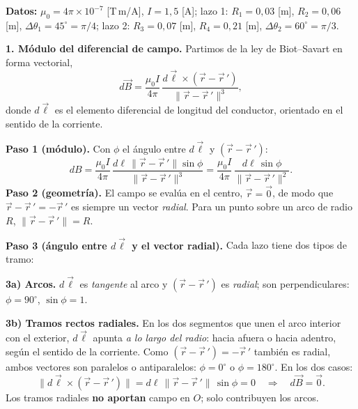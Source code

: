 \documentclass[12pt,letterpaper]{article}
\newcommand{\secgap}{\vspace{0.6cm}}
\begin{document}
\vspace{0.3cm}

\noindent\textbf{Datos:} $\mu_0 = 4\pi\times10^{-7}$ [T\,m/A], $I = 1{,}5$ [A];
lazo 1: $R_1 = 0{,}03$ [m], $R_2 = 0{,}06$ [m], $\Delta\theta_1 = 45^\circ = \pi/4$;
lazo 2: $R_3 = 0{,}07$ [m], $R_4 = 0{,}21$ [m], $\Delta\theta_2 = 60^\circ = \pi/3$.

\secgap

\noindent\textbf{1. M\'odulo del diferencial de campo.} Partimos de la ley de Biot--Savart en forma
vectorial,
\[
    d\vec{B} = \frac{\mu_0 I}{4\pi}\,
    \frac{d\vec{\ell}\times(\vec{r}-\vec{r}\,')}{\lVert\vec{r}-\vec{r}\,'\rVert^{3}},
\]
donde $d\vec{\ell}$ es el elemento diferencial de longitud del conductor, orientado en el sentido de
la corriente.

\noindent\textbf{Paso 1 (m\'odulo).} Con $\phi$ el \'angulo entre $d\vec{\ell}$ y $(\vec{r}-\vec{r}\,')$:
\[
    dB = \frac{\mu_0 I}{4\pi}\,
    \frac{d\ell\,\lVert\vec{r}-\vec{r}\,'\rVert\sin\phi}{\lVert\vec{r}-\vec{r}\,'\rVert^{3}}
    = \frac{\mu_0 I}{4\pi}\,\frac{d\ell\,\sin\phi}{\lVert\vec{r}-\vec{r}\,'\rVert^{2}}.
\]
\textbf{Paso 2 (geometr\'ia).} El campo se eval\'ua en el centro, $\vec{r}=\vec{0}$, de modo que
$\vec{r}-\vec{r}\,' = -\vec{r}\,'$ es siempre un vector \emph{radial}. Para un punto sobre un arco de
radio $R$, $\lVert\vec{r}-\vec{r}\,'\rVert = R$.

\noindent\textbf{Paso 3 (\'angulo entre $d\vec{\ell}$ y el vector radial).} Cada lazo tiene dos tipos
de tramo:

\noindent\textbf{3a) Arcos.} $d\vec{\ell}$ es \emph{tangente} al arco y $(\vec{r}-\vec{r}\,')$ es
\emph{radial}; son perpendiculares: $\phi=90^\circ$, $\sin\phi=1$.

\noindent\textbf{3b) Tramos rectos radiales.} En los dos segmentos que unen el arco interior con el
exterior, $d\vec{\ell}$ apunta \emph{a lo largo del radio}: hacia afuera o hacia adentro, seg\'un el
sentido de la corriente. Como $(\vec{r}-\vec{r}\,')=-\vec{r}\,'$ tambi\'en es radial, ambos vectores
son paralelos o antiparalelos: $\phi = 0^\circ$ o $\phi = 180^\circ$. En los dos casos:
\[
    \lVert d\vec{\ell}\times(\vec{r}-\vec{r}\,')\rVert
    = d\ell\,\lVert\vec{r}-\vec{r}\,'\rVert\,\sin\phi = 0
    \quad\Longrightarrow\quad d\vec{B} = \vec{0}.
\]
Los tramos radiales \textbf{no aportan} campo en $O$; solo contribuyen los arcos.
\end{document}
